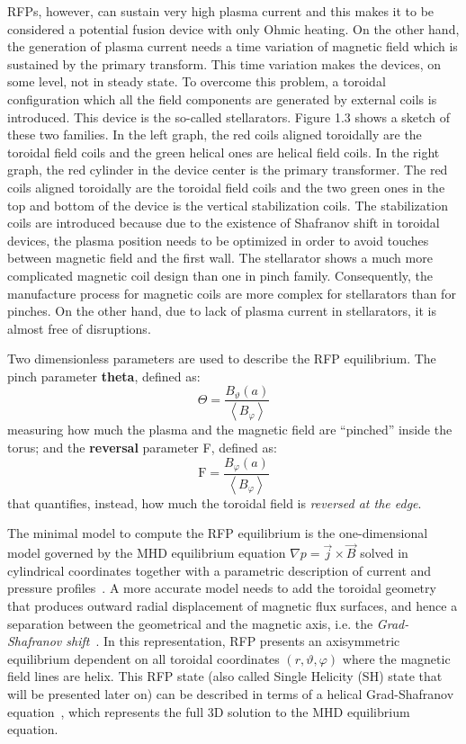 RFPs, however, can sustain very high plasma current and this makes it to be considered a potential fusion device with only Ohmic heating. On the other hand, the generation of plasma current needs a time variation of magnetic field which is sustained by the primary transform. This time variation makes the devices, on some level, not in steady state. To overcome this problem, a toroidal configuration which all the field components are generated by external coils is introduced. This device is the so-called stellarators. Figure 1.3 shows a sketch of these two families. In the left graph, the red coils aligned toroidally are the toroidal field coils and the green helical ones are helical field coils. In the right graph, the red cylinder in the device center is the primary transformer. The red coils aligned toroidally are the toroidal field coils and the two green ones in the top and bottom of the device is the vertical stabilization coils. The stabilization coils are introduced because due to the existence of Shafranov shift in toroidal devices, the plasma position needs to be optimized in order to avoid touches between magnetic field and the first wall. 
The stellarator shows a much more complicated magnetic coil design than one in pinch family. Consequently, the manufacture process for magnetic coils are more complex for stellarators than for pinches. On the other hand, due to lack of plasma current in stellarators, it is almost free of disruptions.

Two dimensionless parameters are used to describe the RFP equilibrium. 
The pinch parameter \textbf{theta}, defined as:
\begin{equation}
    \Theta = \frac{B_\vartheta (a)}{ \left\langle B_\varphi \right\rangle }
\end{equation}
measuring how much the plasma and the magnetic field are “pinched” inside the torus; and the \textbf{reversal} parameter F, defined as:
\begin{equation}
    \mathrm{F} = \frac{B_\varphi(a)}{ \left\langle B_\varphi \right\rangle }
\end{equation}
that quantifies, instead, how much the toroidal field is \emph{reversed at the edge}.

The minimal model to compute the RFP equilibrium is the one-dimensional model governed by the MHD equilibrium equation $\nabla p = \Vec{j} \times \Vec{B}$ solved in cylindrical coordinates together with a parametric description of current and pressure profiles~\cite{Bonomo33}.
A more accurate model needs to add the toroidal geometry that produces outward radial displacement of magnetic flux surfaces, and hence a separation between the geometrical and the magnetic axis, i.e. the \textit{Grad-Shafranov shift}~\cite{freidberg2014ideal}. 
In this representation, RFP presents an axisymmetric equilibrium dependent on all toroidal coordinates $(r, \vartheta, \varphi)$  where the magnetic field lines are helix. This RFP state (also called Single Helicity (SH) state that will be presented later on) can be described in terms of a helical Grad-Shafranov equation~\cite{Bonomo35, Bonomo36}, which represents the full 3D solution to the MHD equilibrium equation.


